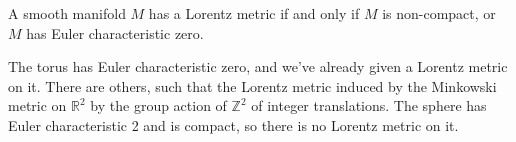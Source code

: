 \documentclass{beamer}
\begin{document}
    \begin{frame}
        \begin{theorem}
            A smooth manifold $M$ has a Lorentz metric if and only if
            $M$ is non-compact, or $M$ has Euler characteristic zero.
        \end{theorem}
        The torus has Euler characteristic zero, and we've already given a
        Lorentz metric on it. There are others, such that the Lorentz metric
        induced by the Minkowski metric on $\mathbb{R}^{2}$ by the group action
        of $\mathbb{Z}^{2}$ of integer translations. The sphere has Euler
        characteristic 2 and is compact, so there is no Lorentz metric on it.
    \end{frame}
\end{document}
